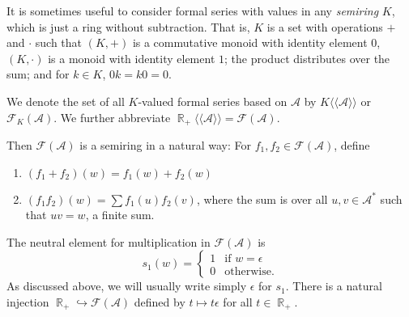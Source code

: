 \documentclass{kepart2010}
\theoremstyle{plain}
\theoremstyle{definition}
\theoremstyle{remark}
\theoremstyle{definition}
\numberwithin{equation}{section}
\begin{document}
It is sometimes useful to consider formal series with values in any
{\em semiring} $K$, which is just a ring without subtraction.  That
is, $K$ is a set with operations $+$ and $\cdot$ such that $(K, +)$
is a commutative monoid with identity element $0$, $(K,\cdot)$ is a
monoid with identity element $1$; the product distributes over the
sum; and for $k \in K$, $0k=k0=0$.

We denote the set of all $K$-valued formal series based on ${{\mathcal A}}$ by
$K \langle \langle {{\mathcal A}} \rangle \rangle$ or $\mathcal{F}_{K}({{\mathcal A}})$.
We further abbreviate $\operatorname{\mathbb R}_{+} \langle \langle {{\mathcal A}} \rangle
\rangle = \mathcal {F}({{\mathcal A}}) $.

Then $\mathcal {F}({{\mathcal A}})$ is a semiring in a natural way: For $f_{1},
f_{2} \in \mathcal{F} ({{\mathcal A}})$, define
\begin{enumerate}
\item $(f_{1} + f_{2}) (w) = f_{1}(w)+f_{2}(w)$
\item $(f_{1}f_{2})(w) = \sum f_{1}(u)f_{2}(v)$,
where the sum is over all $u, v \in {{\mathcal A}}^{*}$ such that $uv=w$, a
finite sum.
 \end{enumerate}
The neutral element for multiplication in ${\mathcal F ({{\mathcal A}})}$ is
 \begin{equation}
 s_{1}(w) = \begin{cases}1 & \text{if $w=\epsilon$} \\0 &
 \text{otherwise.}
 \end{cases}
 \end{equation}
As discussed above, we will usually write simply
$\epsilon $ for $s_1$.
There is a natural injection $\operatorname{\mathbb R}_{+} \hookrightarrow {\mathcal F ({{\mathcal A}})}$
defined by $t
\mapsto t \epsilon$ for all $t\in \operatorname{\mathbb R}_{+}$.
\end{document}
